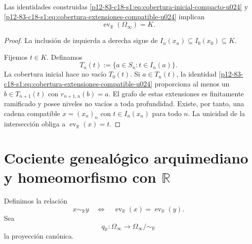 \begin{theorem}
\label{p12-83-c18-s1:thm:sobreyectividad-evaluacion-compacto}
Las identidades construidas
\eqref{p12-83-c18-s1:eq:cobertura-inicial-compacto-u024} y
\eqref{p12-83-c18-s1:eq:cobertura-extensiones-compatible-u024} implican
\begin{equation}
 \operatorname{ev}_{\mathbb R}(\Omega_\infty)=K.
 \label{p12-83-c18-s1:eq:imagen-evaluacion-compacto}
\end{equation}
\end{theorem}

\begin{proof}
La inclusión de izquierda a derecha sigue de
\(I_n(x_n)\subseteq I_0(x_0)\subseteq K\).

Fijemos \(t\in K\). Definamos
\begin{equation}
 T_n(t):=\{a\in S_n:t\in I_n(a)\}.
 \label{p12-83-c18-s1:eq:estados-que-cubren-punto}
\end{equation}
La cobertura inicial hace no vacío \(T_0(t)\). Si \(a\in T_n(t)\), la
identidad \eqref{p12-83-c18-s1:eq:cobertura-extensiones-compatible-u024} proporciona al
menos un \(b\in T_{n+1}(t)\) con \(r_{n+1,n}(b)=a\). El grafo de estas
extensiones es finitamente ramificado y posee niveles no vacíos a toda
profundidad. Existe, por tanto, una cadena compatible \(x=(x_n)_n\) con
\(t\in I_n(x_n)\) para todo \(n\). La unicidad de la intersección obliga a
\(\operatorname{ev}_{\mathbb R}(x)=t\).
\end{proof}

\section{Cociente genealógico arquimediano y homeomorfismo con \texorpdfstring{\(\mathbb R\)}{R}}

Definimos la relación
\begin{equation}
 x\sim_{\mathbb R}y
 \quad\Longleftrightarrow\quad
 \operatorname{ev}_{\mathbb R}(x)
 =\operatorname{ev}_{\mathbb R}(y).
 \label{p12-83-c18-s1:eq:relacion-equivalencia-arquimediana}
\end{equation}
Sea
\begin{equation}
 q_{\mathbb R}:\Omega_\infty
 \longrightarrow\Omega_\infty/\!\sim_{\mathbb R}
 \label{p12-83-c18-s1:eq:proyeccion-cociente-arquimediano}
\end{equation}
la proyección canónica.

